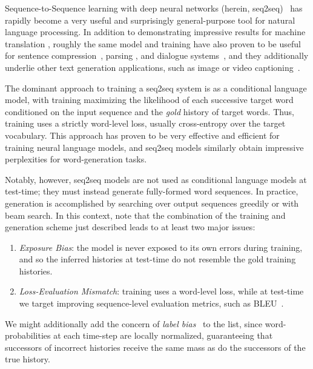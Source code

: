 Sequence-to-Sequence learning with deep neural networks (herein,
seq2seq)~\cite{sutskever11generating,sutskever14sequence} has rapidly
become a very useful and surprisingly general-purpose tool for natural
language processing. In addition to demonstrating impressive results
for machine translation \cite{bahdanau15neural}, roughly the same model and training
have also proven to be useful for sentence compression~\cite{filippova15sentence}, parsing \cite{vinyals15grammar}, and dialogue systems~\cite{serban16building}, and they additionally underlie other text generation applications, such as image or video captioning~\cite{vid2text,showattend}.

The dominant approach to training a seq2seq system is as
a conditional language model, with training maximizing the likelihood of each successive target word conditioned on the input sequence and
the \textit{gold} history of target words. Thus, training uses a strictly word-level loss, usually cross-entropy over the target vocabulary. This approach has proven to be very effective and efficient for training neural language models, and seq2seq models similarly obtain impressive perplexities for word-generation tasks.

Notably, however, seq2seq models are not used as conditional language
models at test-time; they must instead generate fully-formed word sequences. In practice, generation is accomplished by searching over output sequences greedily or with beam search. In this context, 
note that the combination of the training and generation scheme just described leads to at least two major issues:

\begin{enumerate}
\item \textit{Exposure Bias}: the model is never exposed to its own
  errors during training, and so the inferred histories at test-time
  do not resemble the gold training histories.
\item \textit{Loss-Evaluation Mismatch}: training uses a word-level
  loss, while at test-time we target improving sequence-level
  evaluation metrics, such as BLEU~\cite{papineni02bleu}.
\end{enumerate}

We might additionally add the concern of \textit{label bias}~\cite{lafferty01conditional}
to the list, since word-probabilities at each time-step are locally
normalized, guaranteeing that successors of incorrect histories receive
the same mass as do the successors of the true history.

